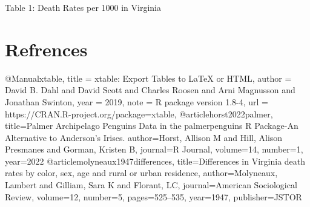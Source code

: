 \documentclass{article}\usepackage[]{graphicx}\usepackage[]{xcolor}
\begin{document}
\begin{multicols}{2}
\indent Table 1: Death Rates per 1000 in Virginia
\section{Refrences}
@Manual{xtable,
    title = {xtable: Export Tables to LaTeX or HTML},
    author = {David B. Dahl and David Scott and Charles Roosen and Arni Magnusson and Jonathan Swinton},
    year = {2019},
    note = {R package version 1.8-4},
    url = {https://CRAN.R-project.org/package=xtable},
  }
@article{horst2022palmer,
  title={Palmer Archipelago Penguins Data in the palmerpenguins R Package-An Alternative to Anderson's Irises.}
  author={Horst, Allison M and Hill, Alison Presmanes and Gorman, Kristen B},
  journal={R Journal},
  volume={14},
  number={1},
  year={2022}
  }
@article{molyneaux1947differences,
  title={Differences in Virginia death rates by color, sex, age and rural or urban residence},
  author={Molyneaux, Lambert and Gilliam, Sara K and Florant, LC},
  journal={American Sociological Review},
  volume={12},
  number={5},
  pages={525--535},
  year={1947},
  publisher={JSTOR}
}

\newpage
\onecolumn

\end{multicols}
\end{document}
